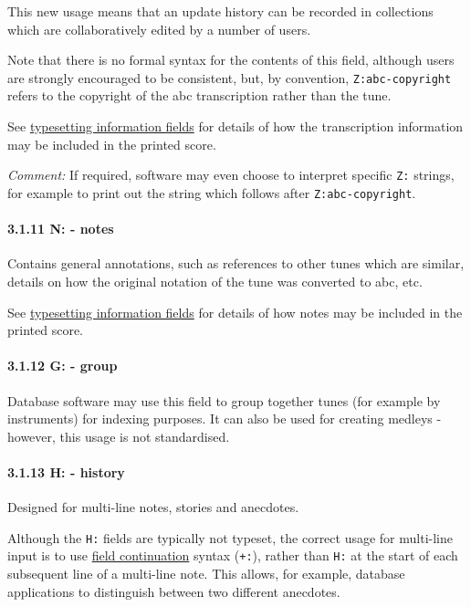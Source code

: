 This new usage means that an update history can be recorded in
collections which are collaboratively edited by a number of users.

Note that there is no formal syntax for the contents of this field,
although users are strongly encouraged to be consistent, but, by
convention, \texttt{Z:abc-copyright} refers to the copyright of the abc
transcription rather than the tune.

See \protect\hyperlink{typesetting_information_fields}{typesetting
information fields} for details of how the transcription information may
be included in the printed score.

\emph{Comment:} If required, software may even choose to interpret
specific \texttt{Z:} strings, for example to print out the string which
follows after \texttt{Z:abc-copyright}.

\hypertarget{nnotes}{\paragraph{3.1.11 N: - notes}\label{nnotes}}

Contains general annotations, such as references to other tunes which
are similar, details on how the original notation of the tune was
converted to abc, etc.

See \protect\hyperlink{typesetting_information_fields}{typesetting
information fields} for details of how notes may be included in the
printed score.

\hypertarget{ggroup}{\paragraph{3.1.12 G: - group}\label{ggroup}}

Database software may use this field to group together tunes (for
example by instruments) for indexing purposes. It can also be used for
creating medleys - however, this usage is not standardised.

\hypertarget{hhistory}{\paragraph{3.1.13 H: - history}\label{hhistory}}

Designed for multi-line notes, stories and anecdotes.

Although the \texttt{H:} fields are typically not typeset, the correct
usage for multi-line input is to use
\protect\hyperlink{field_continuation}{field continuation} syntax
(\texttt{+:}), rather than \texttt{H:} at the start of each subsequent
line of a multi-line note. This allows, for example, database
applications to distinguish between two different anecdotes.

